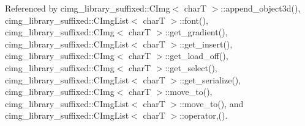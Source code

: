 Referenced by cimg\+\_\+library\+\_\+suffixed\+::\+C\+Img$<$ char\+T $>$\+::append\+\_\+object3d(), cimg\+\_\+library\+\_\+suffixed\+::\+C\+Img\+List$<$ char\+T $>$\+::font(), cimg\+\_\+library\+\_\+suffixed\+::\+C\+Img$<$ char\+T $>$\+::get\+\_\+gradient(), cimg\+\_\+library\+\_\+suffixed\+::\+C\+Img\+List$<$ char\+T $>$\+::get\+\_\+insert(), cimg\+\_\+library\+\_\+suffixed\+::\+C\+Img$<$ char\+T $>$\+::get\+\_\+load\+\_\+off(), cimg\+\_\+library\+\_\+suffixed\+::\+C\+Img$<$ char\+T $>$\+::get\+\_\+select(), cimg\+\_\+library\+\_\+suffixed\+::\+C\+Img\+List$<$ char\+T $>$\+::get\+\_\+serialize(), cimg\+\_\+library\+\_\+suffixed\+::\+C\+Img$<$ char\+T $>$\+::move\+\_\+to(), cimg\+\_\+library\+\_\+suffixed\+::\+C\+Img\+List$<$ char\+T $>$\+::move\+\_\+to(), and cimg\+\_\+library\+\_\+suffixed\+::\+C\+Img\+List$<$ char\+T $>$\+::operator,().

